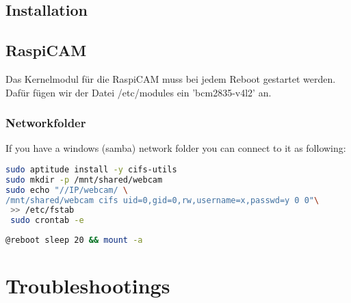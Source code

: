 \documentclass[german,a4paper,11pt]{report}
\begin{document}
\section{Installation}
\section{RaspiCAM}
Das Kernelmodul für die RaspiCAM muss bei jedem Reboot gestartet werden.
Dafür fügen wir der Datei /etc/modules ein 'bcm2835-v4l2' an.

\subsection{Networkfolder}
If you have a windows (samba) network folder you can connect to it as following:
\begin{lstlisting}[language=bash,caption={}]
sudo aptitude install -y cifs-utils
sudo mkdir -p /mnt/shared/webcam
sudo echo "//IP/webcam/ \
/mnt/shared/webcam cifs uid=0,gid=0,rw,username=x,passwd=y 0 0"\
 >> /etc/fstab
 sudo crontab -e
\end{lstlisting}
\begin{lstlisting}[language=bash,caption={cronjob}]
@reboot	sleep 20 && mount -a
\end{lstlisting}

\chapter{Troubleshootings}
\end{document}
